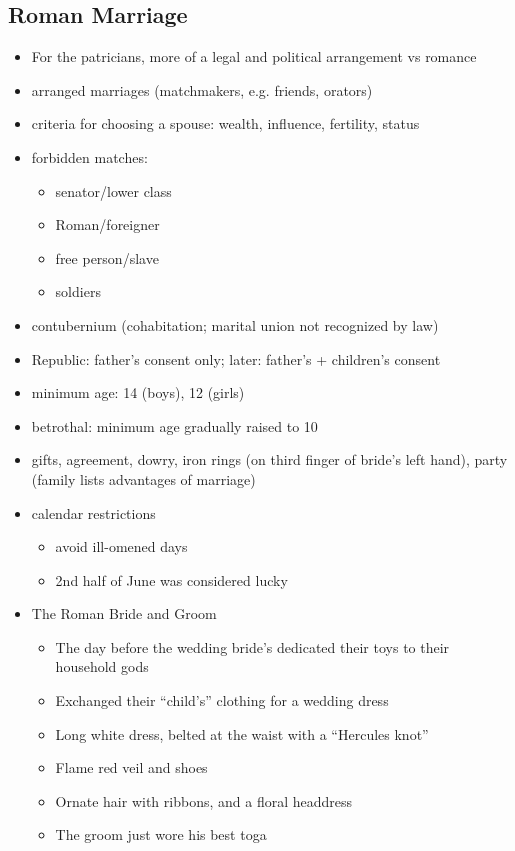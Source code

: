 \documentclass[12pt, twoside]{article}
\begin{document}
\subsection{Roman Marriage}
\begin{itemize}
\item For the patricians, more of a legal and political arrangement vs romance
\item arranged marriages (matchmakers, e.g. friends, orators)
\item criteria for choosing a spouse: wealth, influence, fertility, status
\item forbidden matches: 
	\begin{itemize}
	\item senator/lower class
	\item Roman/foreigner
	\item free person/slave
	\item soldiers
	\end{itemize}
\item contubernium (cohabitation; marital union not recognized by law)
\item Republic: father's consent only; later: father's + children's consent
\item minimum age: 14 (boys), 12 (girls)
\item betrothal: minimum age gradually raised to 10
\item gifts, agreement, dowry, iron rings (on third finger of bride’s left hand), party (family lists advantages of marriage)
\item calendar restrictions
	\begin{itemize}
	\item avoid ill-omened days
	\item 2nd half of June was considered lucky
	\end{itemize}
\item The Roman Bride and Groom
	\begin{itemize}
	\item The day before the wedding bride’s dedicated their toys to their household gods
	\item Exchanged their “child’s” clothing for a wedding dress
	\item Long white dress, belted at the waist with a “Hercules knot”
	\item Flame red veil and shoes
	\item Ornate hair with ribbons, and a floral headdress
	\item The groom just wore his best toga

\end{itemize}
\end{itemize}
\end{document}
